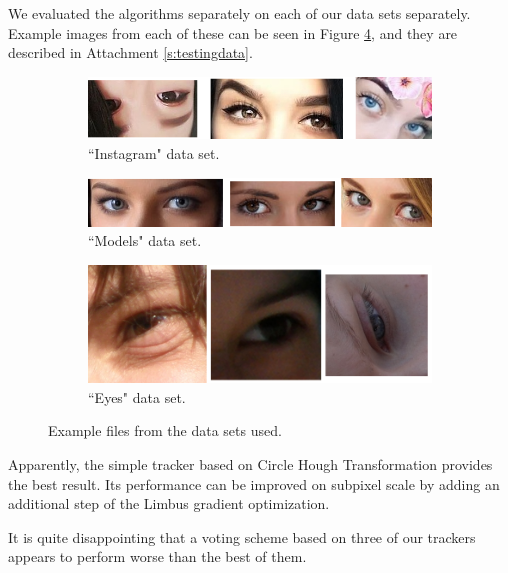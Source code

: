 We evaluated the algorithms separately on each of our data sets separately.
Example images from each of these can be seen in Figure \ref{i:res-data}, and they are described in Attachment \ref{s:testingdata}.

\begin{figure}[t]
	\centering 
	\begin{subfigure}[b]{0.7\textwidth}
		\centering \includegraphics[width=\linewidth]{img/data-instagram.png} \caption{``Instagram" data set.} \label{i:res-data-instagram}
	\end{subfigure}
	\begin{subfigure}[b]{0.7\textwidth}
		\centering \includegraphics[width=\linewidth]{img/data-models.png} \caption{``Models" data set.} \label{i:res-data-models}
	\end{subfigure}
	\begin{subfigure}[b]{0.7\textwidth}
		\centering \includegraphics[width=\linewidth]{img/data-eyes.png} \caption{``Eyes" data set.} \label{i:res-data-eyes}
	\end{subfigure}
	\caption{Example files from the data sets used.}\label{i:res-data}
\end{figure}

Apparently, the simple tracker based on Circle Hough Transformation provides the best result.
Its performance can be improved on subpixel scale by adding an additional step of the Limbus gradient optimization.

It is quite disappointing that a voting scheme based on three of our trackers appears to perform worse than the best of them.

